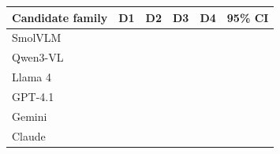 \begin{tabular}{lrrrrr}
\toprule
Candidate family & D1 & D2 & D3 & D4 & 95\% CI\\\midrule
SmolVLM &  &  &  &  & \\
Qwen3-VL &  &  &  &  & \\
Llama 4 &  &  &  &  & \\
GPT-4.1 &  &  &  &  & \\
Gemini &  &  &  &  & \\
Claude &  &  &  &  & \\
\bottomrule
\end{tabular}
